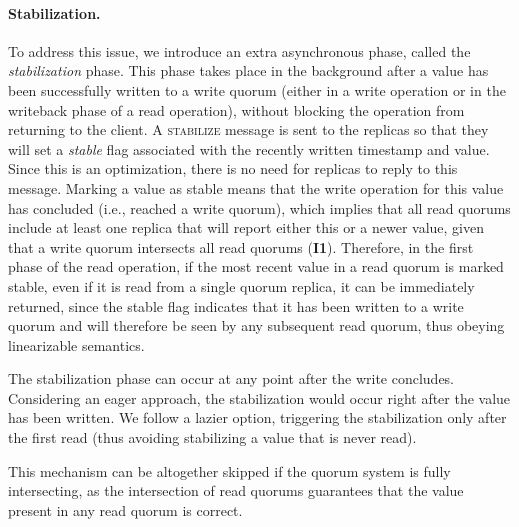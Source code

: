 \paragraph{Stabilization.}
To address this issue, we introduce an extra asynchronous phase,
called the \emph{stabilization} phase. This phase takes
place in the background after a value has been successfully
written to a write quorum (either in a write operation or in the
writeback phase of a read operation), without
blocking the operation from returning to the client. A
\textsc{stabilize} message is sent to the replicas so that they
will set a \emph{stable} flag associated with the recently
written timestamp and value. Since this is an optimization, there
is no need for replicas to reply to this message.  Marking a
value as stable means that the write operation for this value has
concluded (i.e., reached a write quorum), which implies that all
read quorums include at least one replica that will report either
this or a newer value, given that a write quorum intersects all
read quorums (\textbf{I1}). Therefore, in the first phase of the
read operation, if the most recent value in a read quorum is
marked stable, even if it is read from a single quorum replica, it can
be immediately returned, since the stable flag indicates that it
has been written to a write quorum and will therefore be seen by
any subsequent read quorum, thus obeying linearizable semantics.

The stabilization phase can
occur at any point after the write concludes. Considering an eager
approach, the stabilization would occur right after the value has been
written. We follow a lazier option, triggering the stabilization only
after the first read (thus avoiding stabilizing a value that is never
read).

This mechanism can be altogether skipped if the quorum
system is fully intersecting, as the intersection of read quorums
guarantees that the value present in any read quorum is correct.

